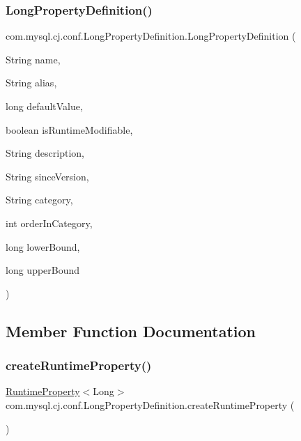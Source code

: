 \subsubsection{\texorpdfstring{Long\+Property\+Definition()}{LongPropertyDefinition()}\hspace{0.1cm}{\footnotesize\ttfamily [2/2]}}
{\footnotesize\ttfamily com.\+mysql.\+cj.\+conf.\+Long\+Property\+Definition.\+Long\+Property\+Definition (\begin{DoxyParamCaption}\item[{String}]{name,  }\item[{String}]{alias,  }\item[{long}]{default\+Value,  }\item[{boolean}]{is\+Runtime\+Modifiable,  }\item[{String}]{description,  }\item[{String}]{since\+Version,  }\item[{String}]{category,  }\item[{int}]{order\+In\+Category,  }\item[{long}]{lower\+Bound,  }\item[{long}]{upper\+Bound }\end{DoxyParamCaption})}



\subsection{Member Function Documentation}
\mbox{\label{classcom_1_1mysql_1_1cj_1_1conf_1_1_long_property_definition_a62dc153cd1b58382888d34b61cdb531c}} 
\subsubsection{\texorpdfstring{create\+Runtime\+Property()}{createRuntimeProperty()}}
{\footnotesize\ttfamily \mbox{\hyperlink{interfacecom_1_1mysql_1_1cj_1_1conf_1_1_runtime_property}{Runtime\+Property}}$<$Long$>$ com.\+mysql.\+cj.\+conf.\+Long\+Property\+Definition.\+create\+Runtime\+Property (\begin{DoxyParamCaption}{ }\end{DoxyParamCaption})}

